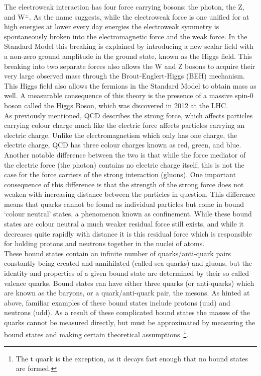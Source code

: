 The electroweak interaction has four force carrying bosons: the photon, the Z, and W$^{\pm}$.  
As the name suggests, while the electroweak force is one unified for at high energies at lower every day energies the electroweak symmetry is spontaneously broken into the electromagnetic force and the weak force.  
In the Standard Model this breaking is explained by introducing a new scalar field with a non-zero ground amplitude in the ground state, known as the Higgs field.  
This breaking into two separate forces also allows the W and Z bosons to acquire their very large observed mass through the Brout-Englert-Higgs (BEH) mechanism.  
This Higgs field also allows the fermions in the Standard Model to obtain mass as well.  
A measurable consequence of this theory is the presence of a massive spin-0 boson called the Higgs Boson, which was discovered in 2012 at the \gls{LHC}.  \\

As previously mentioned, \gls{QCD} describes the strong force, which affects particles carrying colour charge much like the electric force affects particles carrying an electric charge.  
Unlike the electromagnetism which only has one charge, the electric charge, \gls{QCD} has three colour charges known as red, green, and blue.  
Another notable difference between the two is that while the force mediator of the electric force (the photon) contains no electric charge itself, this is not the case for the force carriers of the strong interaction (gluons).  
One important consequence of this difference is that the strength of the strong force does not weaken with increasing distance between the particles in question.  
This difference means that quarks cannot be found as individual particles but come in bound `colour neutral' states, a phenomenon known as confinement.  
While these bound states are colour neutral a much weaker residual force still exists, and while it decreases quite rapidly with distance it is this residual force which is responsible for holding protons and neutrons together in the nuclei of atoms.  \\

These bound states contain an infinite number of quarks/anti-quark pairs constantly being created and annihilated (called sea quarks) and gluons, but the identity and properties of a given bound state are determined by their so called valence quarks.  
Bound states can have either three quarks (or anti-quarks) which are known as the baryons, or a quark/anti-quark pair, the mesons.  
As hinted at above, familiar examples of these bound states include protons (uud) and neutrons (udd).  
As a result of these complicated bound states the masses of the quarks cannot be measured directly, but must be approximated by measuring the bound states and making certain theoretical assumptions~\footnote{The t quark is the exception, as it decays fast enough that no bound states are formed.}.
 

